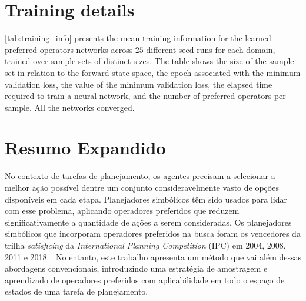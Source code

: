 \documentclass[ppgc,diss,english]{iiufrgs}
\begin{document}



\appendix

\chapter{Training details}
\cref{tab:training_info} presents the mean training information for the learned preferred operators \pog networks across $25$ different seed runs for each domain, trained over sample sets of distinct sizes. The table shows the size of the sample set in relation to the forward state space, the epoch associated with the minimum validation loss, the value of the minimum validation loss, the elapsed time required to train a neural network, and the number of preferred operators per sample. All the networks converged.



\chapter{Resumo Expandido}
\noindent

No contexto de tarefas de planejamento, os agentes precisam a selecionar a melhor ação possível dentre um conjunto consideravelmente vasto de opções disponíveis em cada etapa. Planejadores simbólicos têm sido usados para lidar com esse problema, aplicando operadores preferidos que reduzem significativamente a quantidade de ações a serem consideradas. Os planejadores simbólicos que incorporam operadores preferidos na busca foram os vencedores da trilha \emph{satisficing} da \emph{International Planning Competition} (IPC) em 2004, 2008, 2011 e 2018~\cite{Helmert/2006,Richter.lama.etal/2011,Richter.lama.etal/2011,Seipp-fast.etal/2018}.
No entanto, este trabalho apresenta um método que vai além dessas abordagens convencionais, introduzindo uma estratégia de amostragem e aprendizado de operadores preferidos com aplicabilidade em todo o espaço de estados de uma tarefa de planejamento.
\end{document}
